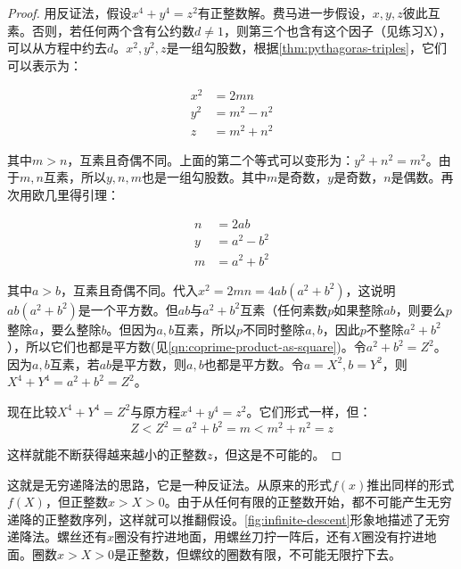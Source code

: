 \documentclass[b5paper]{ctexart}
\begin{document}
\begin{proof}
用反证法，假设$x^4 + y^4 = z^2$有正整数解。费马进一步假设，$x, y, z$彼此互素。否则，若任何两个含有公约数$d \ne 1$，则第三个也含有这个因子（见练习X），可以从方程中约去$d$。$x^2, y^2, z$是一组勾股数，根据\cref{thm:pythagoras-triples}，它们可以表示为：

\begin{align*}
x^2 &= 2mn \\
y^2 &= m^2 - n^2 \\
z &= m^2 + n^2
\end{align*}

其中$m > n$，互素且奇偶不同。上面的第二个等式可以变形为：$y^2 + n^2 = m^2$。由于$m, n$互素，所以$y, n, m$也是一组勾股数。其中$m$是奇数，$y$是奇数，$n$是偶数。再次用欧几里得引理：

\begin{align*}
n &= 2ab \\
y &= a^2 - b^2 \\
m &= a^2 + b^2
\end{align*}

其中$a > b$，互素且奇偶不同。代入$x^2 = 2mn = 4ab(a^2 + b^2)$，这说明$ab(a^2 + b^2)$是一个平方数。但$ab$与$a^2 + b^2$互素（任何素数$p$如果整除$ab$，则要么$p$整除$a$，要么整除$b$。但因为$a, b$互素，所以$p$不同时整除$a, b$，因此$p$不整除$a^2 + b^2$），所以它们也都是平方数(见\cref{qn:coprime-product-as-square})。令$a^2 + b^2 = Z^2$。因为$a, b$互素，若$ab$是平方数，则$a, b$也都是平方数。令$a = X^2, b= Y^2$，则$X^4 + Y^4 = a^2 + b^2 = Z^2$。

现在比较$X^4 + Y^4 = Z^2$与原方程$x^4 + y^4 = z^2$。它们形式一样，但：
\[
Z < Z^2 = a^2 + b^2 = m < m^2 + n^2 = z
\]

这样就能不断获得越来越小的正整数$z$，但这是不可能的。
\end{proof}

这就是无穷递降法的思路，它是一种反证法。从原来的形式$f(x)$推出同样的形式$f(X)$，但正整数$x > X > 0$。由于从任何有限的正整数开始，都不可能产生无穷递降的正整数序列，这样就可以推翻假设。\cref{fig:infinite-descent}形象地描述了无穷递降法。螺丝还有$x$圈没有拧进地面，用螺丝刀拧一阵后，还有$X$圈没有拧进地面。圈数$x > X > 0$是正整数，但螺纹的圈数有限，不可能无限拧下去。
\end{document}
